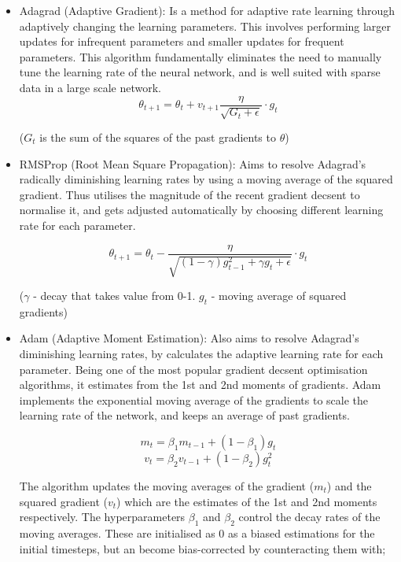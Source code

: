 \documentclass[oneside, 10pt]{article}
\begin{document}
			\begin{itemize}
				\item Adagrad (Adaptive Gradient): Is a method for adaptive rate learning through adaptively changing the learning parameters. This involves performing larger updates for infrequent parameters and smaller updates for frequent parameters. This algorithm fundamentally eliminates the need to manually tune the learning rate of the neural network, and is well suited with sparse data in a large scale network. \cite{28}
				\[\theta_{t+1} = \theta_t + v_{t+1} \frac{\eta}{\sqrt{G_t + \epsilon}} \cdot g_t\]
				\begin{center}
					($G_t$ is the sum of the squares of the past gradients to $\theta$)
				\end{center}
				
				\item RMSProp (Root Mean Square Propagation): Aims to resolve Adagrad’s radically diminishing learning rates by using a moving average of the squared gradient. Thus utilises the magnitude of the recent gradient decsent to normalise it, and gets adjusted automatically by choosing different learning rate for each parameter. \cite{29}
				
				\[\theta_{t+1} = \theta_t - \frac{\eta}{\sqrt{(1 - \gamma) g^2_{t-1} + \gamma g_t + \epsilon}} \cdot g_t\]
				
				\begin{center}
					($\gamma$ - decay that takes value from 0-1. $g_t$ - moving average of squared gradients)
				\end{center} \cite{30}
				
				\item Adam (Adaptive Moment Estimation): Also aims to resolve Adagrad’s diminishing learning rates, by calculates the adaptive learning rate for each parameter. Being one of the most popular gradient decsent optimisation algorithms, it estimates from the 1st and 2nd moments of gradients. Adam implements the exponential moving average of the gradients to scale the learning rate of the network, and keeps an average of past gradients. \cite{31}
				
				\[m_t = \beta_1 m_{t-1} + (1 - \beta_1) g_t\]
				\[v_t = \beta_2 v_{t-1} + (1 - \beta_2) g^2_t\]
				
				The algorithm updates the moving averages of the gradient ($m_t$) and the squared gradient ($v_t$) which are the estimates of the 1st and 2nd moments respectively. The hyperparameters $\beta_1$ and $\beta_2$ control the decay rates of the moving averages. These are initialised as 0 as a biased estimations for the initial timesteps, but an become bias-corrected by counteracting them with;
				

\end{itemize}
\end{document}
